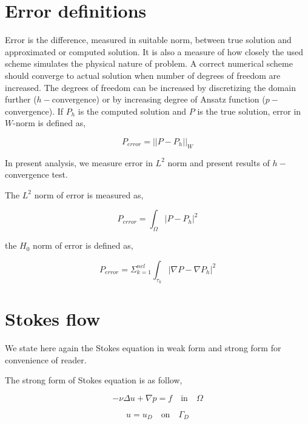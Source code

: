 \documentclass[a4paper,12pt]{book}
\begin{document}
\section{Error definitions}

Error is the difference, measured in suitable norm, between true solution and approximated or computed solution. It is also a measure of how closely the used scheme simulates the physical nature of problem. A correct numerical scheme should converge to actual solution when number of degrees of freedom are increased. The degrees of freedom can be increased by discretizing the domain further ($h-$convergence) or by increasing degree of Ansatz function ($p-$convergence). If $P_h$ is the computed solution and $P$ is the true solution, error in $W$-norm is defined as,

\begin{equation} \label{error_definition}
P_{error} = ||P - P_h||_{W}
\end{equation}

In present analysis, we measure error in $L^2$ norm and present results of $h-$convergence test.

The $L^2$ norm of error is measured as,

\begin{equation}
P_{error} = \int_{\Omega} |P - P_h|^2
\end{equation}

the $H_0$ norm of error is defined as,

\begin{equation}
P_{error} = \Sigma_{k=1}^{nel} \int_{\tau_k} |\nabla P - \nabla P_h|^2
\end{equation}

\section{Stokes flow}\cite{white} \label{Stokes_flow}

We state here again the Stokes equation in weak form and strong form for convenience of reader.

The strong form of Stokes equation is as follow,

\begin{equation} \label{stokes_strong_form}
-\nu \Delta u + \nabla p = f \quad \textrm{in} \quad \Omega
\end{equation}

\begin{equation} \label{dirichlet condition stokes}
u = u_D \quad \textrm{on} \quad \Gamma_D
\end{equation}
\end{document}
